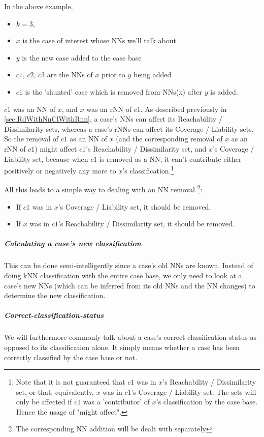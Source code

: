 \documentclass[a4paper,11pt]{report}
\begin{document}
In the above example,
\begin{itemize}
	\item $k=3$, 
	\item $x$ is the case of interest whose NNs  we'll talk about
	\item $y$ is the new case added to the case base
	\item $c1$, $c2$, $c3$ are the NNs of $x$ prior to $y$ being added
	\item $c1$ is the 'shunted' case which is removed from NNs(x) after $y$ is added.
\end{itemize}

$c1$ was an NN of $x$, and $x$ was an rNN of $c1$. As described previously in \ref{sec:RdWithNnClWithRnn}, a case's NNs can affect its Reachability / Dissimilarity sets, whereas a case's rNNs can affect its Coverage / Liability sets. So the removal of $c1$ as an NN of $x$ (and the corresponding removal of $x$ as an rNN of $c1$) might affect $c1$'s Reachability / Dissimilarity set, and $x$'s Coverage / Liability set, because when $c1$ is removed as a NN, it can't contribute either positively or negatively any more to $x$'s classification.\footnote{Note that it is not guaranteed that $c1$ was in $x$'s Reachability / Dissimilarity set, or that, equivalently, $x$ was in $c1$'s Coverage / Liability set. The sets will only be affected if $c1$ was a 'contributor' of $x$'s classification by the case base. Hence the usage of "might affect".}

All this leads to a simple way to dealing with an NN removal \footnote{The corresponding NN addition will be dealt with separately}:
\begin{itemize}
	\item If $c1$ was in $x$'s Coverage / Liability set, it should be removed.
	\item If $x$ was in $c1$'s Reachability / Dissimilarity set, it should be removed.
\end{itemize}

\subparagraph{Calculating a case's new classification}
This can be done semi-intelligently since a case's old NNs are known. Instead of doing kNN classification with the entire case base, we only need to look at a case's new NNs (which can be inferred from its old NNs and the NN changes) to determine the new classification.

\subparagraph{Correct-classification-status}
We will furthermore commonly talk about a case's correct-classification-status as opposed to its classification alone. It simply means whether a case has been correctly classified by the case base or not. 
\end{document}
